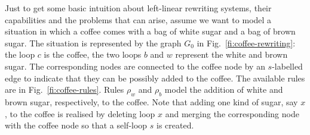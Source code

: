 \documentclass[a4paper,UKenglish,cleveref,pdftex,thm-restate,numberwithinsect]{lipics-v2021}
\begin{document}





Just to get some basic intuition about left-linear rewriting systems, their capabilities and the problems that can arise, assume we want to model a situation in which a coffee comes with a bag of white sugar and a bag of brown sugar. The situation is represented by the graph $G_0$ in Fig.~\ref{fi:coffee-rewriting}: the loop $\mathit{c}$ is the coffee, the two loops $b$ and $w$  represent the white and brown sugar. The corresponding nodes are connected to the coffee node by an $s$-labelled edge to indicate that they can be possibly added to the coffee. The available rules are in Fig.~\ref{fi:coffee-rules}. Rules $\rho_w$ and $\rho_b$ model the addition of white and brown sugar, respectively, to the coffee.
%
Note that adding one kind of sugar, say $x$, to the coffee is realised
by deleting loop $x$ and merging the corresponding node with the
coffee node so that a self-loop $s$ is created.
\end{document}
